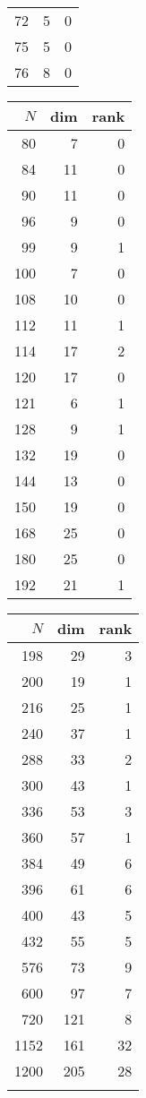 \begin{table}
\begin{tabular}{rrr}
        72 & 5 & 0 \\
        75 & 5 & 0 \\
        76 & 8 & 0 \\
        \bottomrule
    \end{tabular}
    \begin{tabular}{rrr}
        \toprule
        $N$ & dim & rank \\
        \midrule
        80 & 7 & 0 \\
        84 & 11 & 0 \\
        90 & 11 & 0 \\
        96 & 9 & 0 \\
        99 & 9 & 1 \\
        100 & 7 & 0 \\
        108 & 10 & 0 \\
        112 & 11 & 1 \\
        114 & 17 & 2 \\
        120 & 17 & 0 \\
        121 & 6 & 1 \\
        128 & 9 & 1 \\
        132 & 19 & 0 \\
        144 & 13 & 0 \\
        150 & 19 & 0 \\
        168 & 25 & 0 \\
        180 & 25 & 0 \\
        192 & 21 & 1 \\
        \bottomrule
    \end{tabular}
    \begin{tabular}{rrr}
        \toprule
        $N$ & dim & rank \\
        \midrule
        198 & 29 & 3 \\
        200 & 19 & 1 \\
        216 & 25 & 1 \\
        240 & 37 & 1 \\
        288 & 33 & 2 \\
        300 & 43 & 1 \\
        336 & 53 & 3 \\
        360 & 57 & 1 \\
        384 & 49 & 6 \\
        396 & 61 & 6 \\
        400 & 43 & 5 \\
        432 & 55 & 5 \\
        576 & 73 & 9 \\
        600 & 97 & 7 \\
        720 & 121 & 8 \\
        1152 & 161 & 32 \\
        1200 & 205 & 28 \\
             & \\
             \bottomrule
    \end{tabular}
\end{table}
